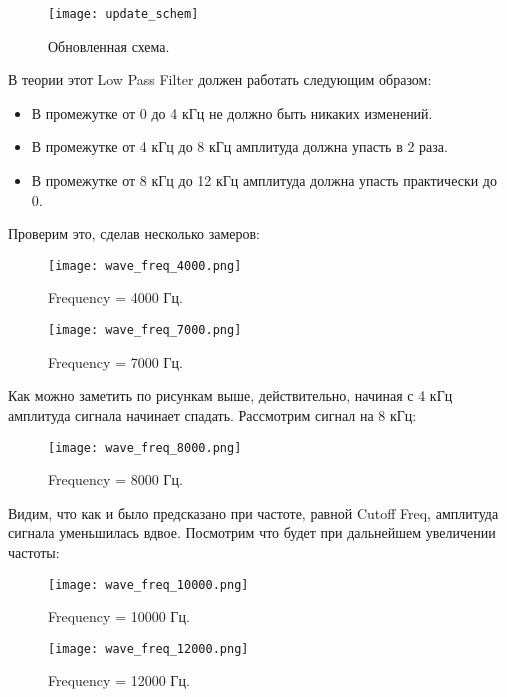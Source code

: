 \documentclass[a4paper,12pt]{extarticle}
\begin{document}
\begin{figure}[H]
    \centering
    \texttt{[image: update\_schem]}
    \caption{Обновленная схема.} %
    \label{fig:update_schem} %
\end{figure}
В теории этот Low Pass Filter должен работать следующим образом:
\begin{itemize}[nolistsep]
    \item В промежутке от 0 до 4 кГц не должно быть никаких изменений.
    \item В промежутке от 4 кГц до 8 кГц амплитуда должна упасть в 2 раза.
    \item В промежутке от 8 кГц до 12 кГц амплитуда должна упасть практически до 0.
\end{itemize}
Проверим это, сделав несколько замеров:
\begin{figure}[H]
    \centering
    \texttt{[image: wave\_freq\_4000.png]}
    \caption{Frequency = 4000 Гц.} %
    \label{fig:wave_freq_4000} %
\end{figure}
\begin{figure}[H]
    \centering
    \texttt{[image: wave\_freq\_7000.png]}
    \caption{Frequency = 7000 Гц.} %
    \label{fig:wave_freq_7000} %
\end{figure}
Как можно заметить по рисункам выше, действительно, начиная с 4 кГц амплитуда сигнала
начинает спадать. Рассмотрим сигнал на 8 кГц:
\begin{figure}[H]
    \centering
    \texttt{[image: wave\_freq\_8000.png]}
    \caption{Frequency = 8000 Гц.} %
    \label{fig:wave_freq_8000} %
\end{figure}
Видим, что как и было предсказано при частоте, равной Cutoff Freq, амплитуда сигнала
уменьшилась вдвое. Посмотрим что будет при дальнейшем увеличении частоты:
\begin{figure}[H]
    \centering
    \texttt{[image: wave\_freq\_10000.png]}
    \caption{Frequency = 10000 Гц.} %
    \label{fig:wave_freq_10000} %
\end{figure}
\begin{figure}[H]
    \centering
    \texttt{[image: wave\_freq\_12000.png]}
    \caption{Frequency = 12000 Гц.} %
    \label{fig:wave_freq_12000} %
\end{figure}
\end{document}
